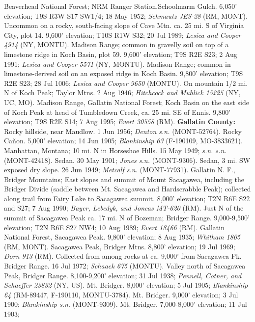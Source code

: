 Beaverhead National Forest; NRM Ranger Station,Schoolmarm Gulch.
6,050' elevation; T9S R3W S17 SW1/4; 18 May 1952;
\textit{Schmautz JES-28} (RM, MONT).
Uncommon on a rocky, south-facing slope of Cave Mtn. ca. 25 mi. S of
Virginia City, plot 14. 9,600' elevation; T10S R1W S32; 20 Jul 1989;
\textit{Lesica and Cooper 4914} (NY, MONTU).
Madison Range; common in gravelly soil on top of a limestone ridge in
Koch Basin, plot 59. 9,600' elevation; T9S R2E S23; 2 Aug 1991;
\textit{Lesica and Cooper 5571} (NY, MONTU).
Madison Range; common in limestone-derived soil on an exposed ridge in
Koch Basin. 9,800' elevation; T9S R2E S23; 28 Jul 1006;
\textit{Lesica and Cooper 9650} (MONTU).
On mountain 1/2 mi. N of Koch Peak; Taylor Mtns. 2 Aug 1946;
\textit{Hitchcock and Muhlick 15225} (NY, UC, MO).
Madison Range, Gallatin National Forest; Koch Basin on the east side of
Koch Peak at head of Tumbledown Creek, ca. 25 mi. SE of Ennis.
9,800' elevation; T9S R2E S14; 7 Aug 1995; \textit{Evert 30558} (RM).
  \textbf{Gallatin County:}
Rocky hillside, near Maudlow. 1 Jun 1956; \textit{Denton s.n.} (MONT-52764).
Rocky Cañon. 5,000' elevation; 14 Jun 1905;
\textit{Blankinship 63} (F-190109, MO-3833621).
Manhattan, Montana; 10 mi. N in Horseshoe Hills. 15 May 1949;
\textit{s.n. s.n.} (MONT-42418).
Sedan. 30 May 1901; \textit{Jones s.n.} (MONT-9306).
Sedan, 3 mi. SW exposed dry slope. 26 Jun 1949;
\textit{Metcalf s.n.} (MONT-77931).
Gallatin N. F., Bridger Mountains; East slopes and summit of Mount Sacagawea,
including the Bridger Divide (saddle between Mt. Sacagawea and Hardscrabble
Peak); collected along trail from Fairy Lake to Sacagawea summit.
8,000' elevation; T2N R6E S22 and S27; 7 Aug 1990;
\textit{Bayer, Lebedyk, and Joncas MT-620} (RM).
Just N of the summit of Sacagawea Peak ca. 17 mi. N of Bozeman; Bridger Range.
9,000-9,500' elevation; T2N R6E S27 NW4; 10 Aug 1989; \textit{Evert 18466} (RM).
Gallatin National Forest, Sacagawea Peak. 9,800' elevation; 8 Aug 1935;
\textit{Whitham 1805} (RM, MONT).
Sacagawea Peak, Bridger Mtns. 8,800' elevation; 19 Jul 1969;
\textit{Dorn 913} (RM).
Collected from among rocks at ca. 9,000' from Sacagawea Pk. Bridger Range.
16 Jul 1972; \textit{Schaack 675} (MONTU).
Valley north of Sacagawea Peak, Bridger Range. 8,100-9,200' elevation;
31 Jul 1938; \textit{Pennell, Cotner, and Schaeffer 23832} (NY, US).
Mt. Bridger. 8,000' elevation; 5 Jul 1905; \textit{Blankinship 64}
(RM-89447, F-190110, MONTU-3784).
Mt. Bridger. 9,000' elevation; 3 Jul 1900;
\textit{Blankinship s.n.} (MONT-9309).
Mt. Bridger. 7,000-8,000' elevation; 11 Jul 1903;
